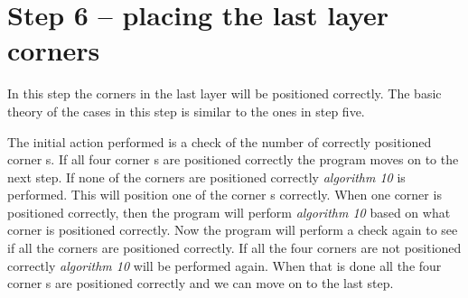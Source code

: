 \section{Step 6 -- placing the last layer corners}
In this step the corners in the last layer will be positioned correctly. 
The basic theory of the cases in this step is similar to the ones in step five.

The initial action performed is a check of the number of correctly positioned corner \cpiece{}s. 
If all four corner \cpiece{}s are positioned correctly the program moves on to the next step.
If none of the corners are positioned correctly \textit{algorithm 10} is performed. This will position one of the corner \cpiece{}s correctly.
When one corner is positioned correctly, then the program will perform \textit{algorithm 10} based on what corner is positioned correctly.
Now the program will perform a check again to see if all the corners are positioned correctly. If all the four corners are not positioned correctly \textit{algorithm 10} will be performed again.
When that is done all the four corner \cpiece{}s are positioned correctly and we can move on to the last step.
